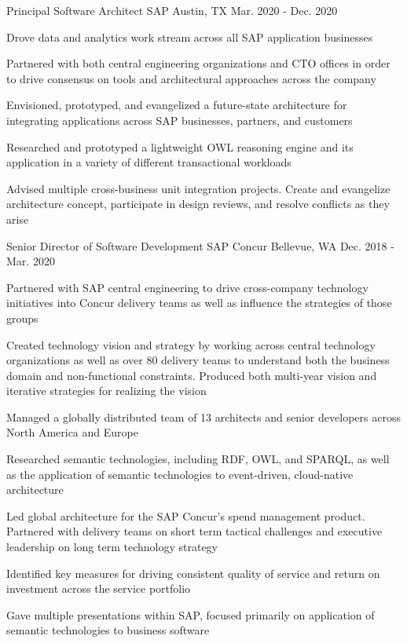 \begin{cventries}

\cventry
{Principal Software Architect}
{SAP}
{Austin, TX}
{Mar. 2020 - Dec. 2020}
{
  \begin{cvitems}
  \item {Drove data and analytics work stream across all SAP application businesses}
  \item {Partnered with both central engineering organizations and CTO offices in order to drive consensus on tools and architectural approaches across the company}
  \item {Envisioned, prototyped, and evangelized a future-state architecture for integrating applications across SAP businesses, partners, and customers}
  \item {Researched and prototyped a lightweight OWL reasoning engine and its application in a variety of different transactional workloads}
  \item {Advised multiple cross-business unit integration projects. Create and evangelize architecture concept, participate in design reviews, and resolve conflicts as they arise}
  \end{cvitems}
}


\cventry
{Senior Director of Software Development}
{SAP Concur}
{Bellevue, WA}
{Dec. 2018 - Mar. 2020}
{
  \begin{cvitems}
  \item {Partnered with SAP central engineering to drive cross-company technology initiatives into Concur delivery teams as well as influence the strategies of those groups}
  \item {Created technology vision and strategy by working across central technology organizations as well as over 80 delivery teams to understand both the business domain and non-functional constraints. Produced both multi-year vision and iterative strategies for realizing the vision}
  \item {Managed a globally distributed team of 13 architects and senior developers across North America and Europe}
  \item {Researched semantic technologies, including RDF, OWL, and SPARQL, as well as the application of semantic technologies to event-driven, cloud-native architecture}
  \item {Led global architecture for the SAP Concur’s spend management product. Partnered with delivery teams on short term tactical challenges and executive leadership on long term technology strategy}
  \item {Identified key measures for driving consistent quality of service and return on investment across the service portfolio}
  \item {Gave multiple presentations within SAP, focused primarily on application of semantic technologies to business software}
  \end{cvitems}
}


\end{cventries}
